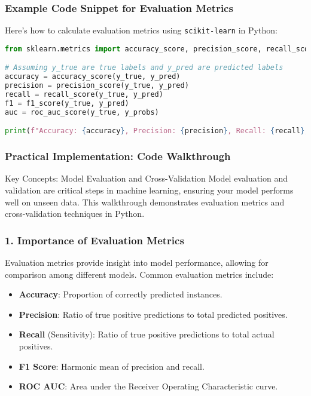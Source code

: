 \documentclass[aspectratio=169]{beamer}
\begin{document}
\begin{frame}[fragile]
    \frametitle{Example Code Snippet for Evaluation Metrics}
    Here’s how to calculate evaluation metrics using \texttt{scikit-learn} in Python:
    \begin{lstlisting}[language=Python]
from sklearn.metrics import accuracy_score, precision_score, recall_score, f1_score, roc_auc_score

# Assuming y_true are true labels and y_pred are predicted labels
accuracy = accuracy_score(y_true, y_pred)
precision = precision_score(y_true, y_pred)
recall = recall_score(y_true, y_pred)
f1 = f1_score(y_true, y_pred)
auc = roc_auc_score(y_true, y_probs)

print(f"Accuracy: {accuracy}, Precision: {precision}, Recall: {recall}, F1 Score: {f1}, AUC: {auc}")
    \end{lstlisting}
\end{frame}

\begin{frame}
    \frametitle{Practical Implementation: Code Walkthrough}
    \begin{block}{Key Concepts: Model Evaluation and Cross-Validation}
        Model evaluation and validation are critical steps in machine learning, ensuring your model performs well on unseen data. This walkthrough demonstrates evaluation metrics and cross-validation techniques in Python.
    \end{block}
\end{frame}

\begin{frame}
    \frametitle{1. Importance of Evaluation Metrics}
    Evaluation metrics provide insight into model performance, allowing for comparison among different models. Common evaluation metrics include:
    
    \begin{itemize}
        \item \textbf{Accuracy}: Proportion of correctly predicted instances.
        \item \textbf{Precision}: Ratio of true positive predictions to total predicted positives.
        \item \textbf{Recall} (Sensitivity): Ratio of true positive predictions to total actual positives.
        \item \textbf{F1 Score}: Harmonic mean of precision and recall.
        \item \textbf{ROC AUC}: Area under the Receiver Operating Characteristic curve.
    \end{itemize}
\end{frame}
\end{document}
